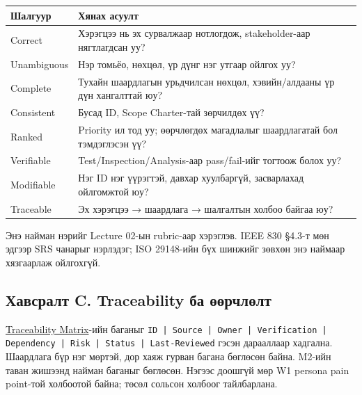 \documentclass[
  11pt,
  a4paper,
]{article}
\begin{document}
\begin{longtable}[]{@{}
  >{\raggedright\arraybackslash}p{}
  >{\raggedright\arraybackslash}p{}@{}}
\toprule\noalign{}
\begin{minipage}[b]{\linewidth}\raggedright
Шалгуур
\end{minipage} & \begin{minipage}[b]{\linewidth}\raggedright
Хянах асуулт
\end{minipage} \\
\midrule\noalign{}
\endhead
\bottomrule\noalign{}
\endlastfoot
Correct & Хэрэгцээ нь эх сурвалжаар нотлогдож, stakeholder-аар
нягтлагдсан уу? \\
Unambiguous & Нэр томьёо, нөхцөл, үр дүнг нэг утгаар ойлгох уу? \\
Complete & Тухайн шаардлагын урьдчилсан нөхцөл, хэвийн/алдааны үр дүн
хангалттай юу? \\
Consistent & Бусад ID, Scope Charter-тай зөрчилдөх үү? \\
Ranked & Priority ил тод уу; өөрчлөгдөх магадлалыг шаардлагатай бол
тэмдэглэсэн үү? \\
Verifiable & Test/Inspection/Analysis-аар pass/fail-ийг тогтоож болох
уу? \\
Modifiable & Нэг ID нэг үүрэгтэй, давхар хуулбаргүй, засварлахад
ойлгомжтой юу? \\
Traceable & Эх хэрэгцээ → шаардлага → шалгалтын холбоо байгаа юу? \\
\end{longtable}

Энэ найман нэрийг Lecture 02-ын rubric-аар хэрэглэв. IEEE 830 §4.3-т мөн
эдгээр SRS чанарыг нэрлэдэг; ISO 29148-ийн бүх шинжийг зөвхөн энэ
наймаар хязгаарлаж ойлгохгүй.

\subsection{Хавсралт C. Traceability ба
өөрчлөлт}\label{doc3-ux445ux430ux432ux441ux440ux430ux43bux442-c.-traceability-ux431ux430-ux4e9ux4e9ux440ux447ux43bux4e9ux43bux442}

\href{../../requirements/traceability-matrix.md}{Traceability
Matrix}-ийн баганыг
\nolinkurl{ID | Source | Owner | Verification | Dependency | Risk | Status | Last-Reviewed}
гэсэн дарааллаар хадгална. Шаардлага бүр нэг мөртэй, дор хаяж гурван
багана бөглөсөн байна. M2-ийн таван жишээнд найман баганыг бөглөсөн.
Нэгээс доошгүй мөр W1 persona pain point-той холбоотой байна; төсөл
сольсон холбоог тайлбарлана.
\end{document}
